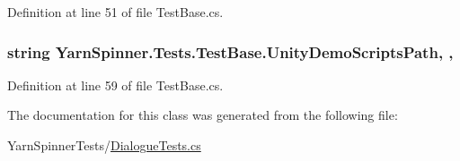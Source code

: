Definition at line 51 of file Test\-Base.\-cs.

\hypertarget{a00154_a39922286f6255e4fd0e433a4fc7521c4}{
\subsubsection[{Unity\-Demo\-Scripts\-Path}]{\setlength{\rightskip}{0pt plus 5cm}string Yarn\-Spinner.\-Tests.\-Test\-Base.\-Unity\-Demo\-Scripts\-Path\hspace{0.3cm}{\ttfamily [static]}, {\ttfamily [get]}, {\ttfamily [inherited]}}}\label{a00154_a39922286f6255e4fd0e433a4fc7521c4}


Definition at line 59 of file Test\-Base.\-cs.



The documentation for this class was generated from the following file\-:\begin{DoxyCompactItemize}
\item 
Yarn\-Spinner\-Tests/\hyperlink{a00305}{Dialogue\-Tests.\-cs}\end{DoxyCompactItemize}
